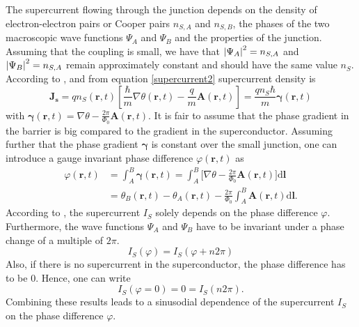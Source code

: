 \documentclass[a4paper,10pt]{article}
\newcommand{\dif}{\mathrm{d}}
\begin{document}
The supercurrent flowing through the junction depends on the density of electron-electron pairs or Cooper pairs $n_{S,A}$ and $n_{S,B}$, the phases of the two macroscopic wave functions $\Psi_A$ and $\Psi_B$ and the properties of the junction. Assuming that the coupling is small, we have that $\abs{\Psi_A}^2 = n_{S,A}$ and $\abs{\Psi_B}^2 = n_{S,A}$ remain approximately constant and should have the same value $n_{S}$. 
According to \cite{grossmarx}, and from equation \eqref{supercurrent2} supercurrent density is
\begin{equation}
    \mathbf{J_s} = q n_S(\mathbf{r},t) \left[ \frac{\hbar}{m} \nabla \theta(\mathbf{r},t) - \frac{q}{m} \mathbf{A}(\mathbf{r},t) \right] = \frac{q n_S \hbar}{m} \mathbf{\gamma}(\mathbf{r},t)
\end{equation}
with $\mathbf{\gamma}(\mathbf{r},t) = \nabla \theta - \frac{2 \pi}{\Phi_0} \mathbf{A}(\mathbf{r},t)$. It is fair to assume that the phase gradient in the barrier is big compared to the gradient in the superconductor. Assuming further that the phase gradient $\mathbf{\gamma}$ is constant over the small junction, one can introduce a gauge invariant phase difference $\varphi(\mathbf{r}, t)$ as \\
\begin{equation}
    \begin{split}
        \label{eq_phase}
        \varphi(\mathbf{r}, t) &= \int^B_A \mathbf{\gamma}(\mathbf{r},t) = \int^B_A \big[ \nabla \theta - \frac{2 \pi}{\Phi_0} \mathbf{A}(\mathbf{r},t) \big] \dif \mathbf{l} \\
        &= \theta_B(\mathbf{r}, t) - \theta_A(\mathbf{r}, t) - \frac{2 \pi}{\Phi_0} \int^B_A \mathbf{A}(\mathbf{r},t) \dif \mathbf{l}.
    \end{split}
\end{equation}
According to \cite{skriptum}, the supercurrent $I_S$ solely depends on the phase difference $\varphi$. Furthermore, the wave functions $\Psi_A$ and $\Psi_B$ have to be invariant under a phase change of a multiple of $2 \pi$. 
\begin{equation}
    I_S(\varphi) = I_S(\varphi + n 2 \pi)
\end{equation}
Also, if there is no supercurrent in the superconductor, the phase difference has to be $0$. Hence, one can write 
\begin{equation}
    I_S(\varphi = 0) = 0 = I_S( n 2 \pi).
\end{equation}
Combining these results leads to a sinusodial dependence of the supercurrent $I_S$ on the phase difference $\varphi$.
\end{document}
